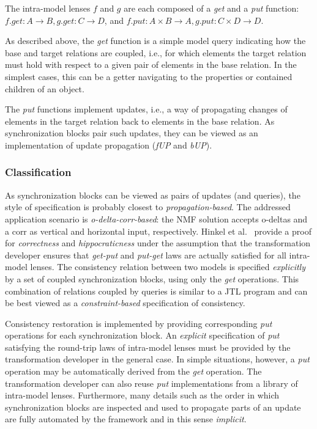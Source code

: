 The intra-model lenses $f$ and $g$ are each composed of a \emph{get} and a \emph{put} function:  $f.get: A \rightarrow B, g.get: C \rightarrow D$, and $f.put: A \times B \rightarrow A, g.put:  C \times D \rightarrow D$.

As described above, the \emph{get} function is a simple model query indicating how the base and target relations are coupled, i.e., for which elements the target relation must hold with respect to a given pair of elements in the base relation.
In the simplest cases, this can be a getter navigating to the properties or contained children of an object.

The \emph{put} functions implement updates, i.e., a way of propagating changes of elements in the target relation back to elements in the base relation.
As synchronization blocks pair such updates, they can be viewed as an implementation of update propagation (\emph{fUP} and \emph{bUP}).

\subsubsection{Classification}
\label{sec:ClassificationNMF}

As synchronization blocks can be viewed as pairs of updates (and queries), the style of specification is probably closest to \emph{propagation-based}.
%
The addressed application scenario is \emph{o-delta-corr-based}: the NMF solution accepts o-deltas and a corr as vertical and horizontal input, respectively.
%
Hinkel et al.~\cite{SoSyM2017-Hinkel} provide a proof for \emph{correctness} and \emph{hippocraticness} under the assumption that the transformation developer ensures that \emph{get-put} and \emph{put-get} laws are actually satisfied for all intra-model lenses.
%
The consistency relation between two models is specified \emph{explicitly} by a set of coupled synchronization blocks, using only the \emph{get} operations.
This combination of relations coupled by queries is similar to a JTL program and can be best viewed as a \emph{constraint-based} specification of consistency. 

Consistency restoration is implemented by providing corresponding \emph{put} operations for each synchronization block.
An \emph{explicit} specification of \emph{put} satisfying the round-trip laws of intra-model lenses must be provided by the transformation developer in the general case.
In simple situations, however, a \emph{put} operation may be automatically derived from the \emph{get} operation.
The transformation developer can also reuse \emph{put} implementations from a library of intra-model lenses.
Furthermore, many details such as the order in which synchronization blocks are inspected and used to propagate parts of an update are fully automated by the framework and in this sense \emph{implicit}.

